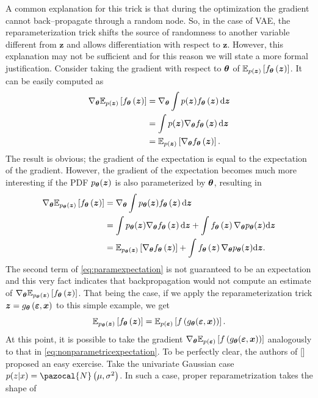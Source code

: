 A common explanation for this trick is that during the optimization the gradient cannot back--propagate through a random node. So, in the case of VAE, the reparameterization trick shifts the source of randomness to another variable different from $\boldsymbol{z}$ and allows differentiation with respect to $\boldsymbol{z}$. However, this explanation may not be sufficient and for this reason we will state a more formal justification. Consider taking the gradient with respect to $\bt$ of $\mathbb{E}_{p(\bz)}\left[\model{z} \right]$. It can be easily computed as
\begin{align}
    \nabla_{\bt}  \mathbb{E}_{p(\bz)}\left[\model{z} \right] &= \nabla_{\bt} \int p(\bz) \model{z} \d{\bz} \\
    &= \int p(\bz) \nabla_{\bt} \model{z} \d{\bz} \\
    &=  \mathbb{E}_{p(\bz)}\left[\nabla_{\bt}\model{z} \right].\label{eq:nonparametricexpectation}
\end{align}
The result is obvious; the gradient of the expectation is equal to the expectation of the gradient. However, the gradient of the expectation becomes much more interesting if the PDF $p_{\bt}(\bz)$ is also parameterized by $\bt$, resulting in 
\begin{align}
    \nabla_{\bt}  \mathbb{E}_{p_{\bt}(\bz)}\left[\model{z} \right] &= \nabla_{\bt} \int p_{\bt}(\bz) \model{z} \d{\bz} \\
    &= \int p_{\bt}(\bz) \nabla_{\bt} \model{z} \d{\bz} + \int  \model{z} \nabla_{\bt}p_{\bt}(\bz)\d{\bz} \\
    &=  \mathbb{E}_{p_{\bt}(\bz)}\left[\nabla_{\bt}\model{z} \right] + \int  \model{z} \nabla_{\bt}p_{\bt}(\bz)\d{\bz}. \label{eq:paramexpectation}
\end{align}
The second term of \eqref{eq:paramexpectation} is not guaranteed to be an expectation and this very fact indicates that backpropagation would not compute an estimate of $\nabla_{\bt}  \mathbb{E}_{p_{\bt}(\bz)}\left[\model{z} \right]$. That being the case, if we apply the reparameterization trick $\bz =g_{\bt}\left(\boldsymbol{\varepsilon},\bx\right)$ to this simple example, we get
\begin{equation}
\mathbb{E}_{p_{\bt}(\bz)}\left[\model{z} \right] = \mathbb{E}_{p(\boldsymbol{\varepsilon})}\left[f\left(g_{\bt}(\boldsymbol{\varepsilon}, \bx)\right) \right].
\end{equation}
At this point, it is possible to take the gradient $\nabla_{\bt} \mathbb{E}_{p(\boldsymbol{\varepsilon})}\left[f\left(g_{\bt}(\boldsymbol{\varepsilon}, \bx)\right) \right]$ analogously to that in \eqref{eq:nonparametricexpectation}. To be perfectly clear, the authors of [] proposed an easy exercise. Take the univariate Gaussian case $p(z|x) = \pazocal{N}\left(\mu, \sigma^2\right)$. In such a case, proper reparametrization takes the shape of
